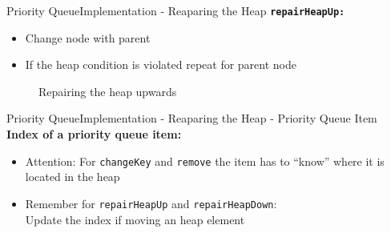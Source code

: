 \begin{frame}{Priority Queue}{Implementation - Reaparing the Heap}
  {\color{Mittel-Blau}\texttt{\textbf{repairHeapUp:}}}
  \begin{itemize}
    \item
      Change node with parent
    \item
      If the {\color{Mittel-Blau}heap condition} is violated repeat for parent
      node
  \end{itemize}
  \begin{center}
    \begin{figure}[!h]%
      \begin{columns}%
        \begin{column}{0.45\textwidth}%
          \begin{minipage}{\textwidth}%
            \begin{center}%
            \end{center}%
          \end{minipage}%
        \end{column}%
        \begin{column}{0.45\textwidth}%
          \begin{minipage}{\textwidth}%
            \begin{center}%
            \end{center}%
          \end{minipage}%
        \end{column}%
      \end{columns}%
      \caption{Repairing the heap upwards}%
      \label{fig:priority_queue:impl_repair_heap_up2}%
    \end{figure}
  \end{center}
\end{frame}


\begin{frame}{Priority Queue}{Implementation - Reaparing the Heap -
    Priority Queue Item}
  \textbf{Index of a priority queue item:}
  \begin{itemize}
    \item
      Attention:
      For {\color{Mittel-Blau}\texttt{changeKey}} and
      {\color{Mittel-Blau}\texttt{remove}} the item has to \enquote{know} where
      it is located in the heap
    \item
      Remember for {\color{Mittel-Blau}\texttt{repairHeapUp}} and
      {\color{Mittel-Blau}\texttt{repairHeapDown}}:\\
      Update the index if moving an heap element
  \end{itemize}
\end{frame}

